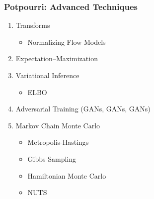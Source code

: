 \documentclass{beamer}
\begin{document}
\begin{frame}
  \frametitle{Potpourri: Advanced Techniques}
  \begin{enumerate}
    \item Transforms
      \begin{itemize}
        \item Normalizing Flow Models
      \end{itemize}
    \item Expectation–Maximization
    \item Variational Inference
      \begin{itemize}
        \item ELBO
      \end{itemize}
    \item Adversarial Training (GANs, GANs, GANs)
    \item Markov Chain Monte Carlo
    \begin{itemize}
      \item Metropolis-Hastings
      \item Gibbs Sampling
      \item Hamiltonian Monte Carlo
      \item NUTS
    \end{itemize}
  \end{enumerate}
\end{frame}
\end{document}
